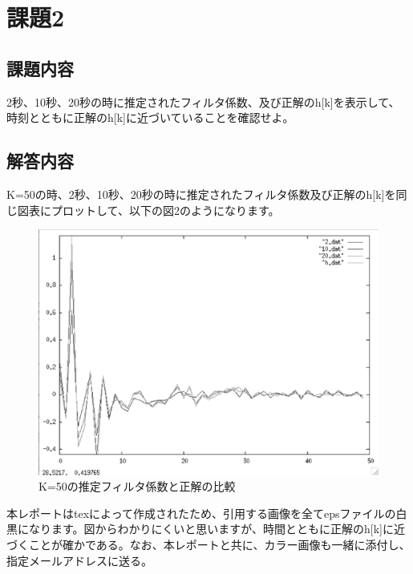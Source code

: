 \documentclass[a4j,12]{jarticle}
\begin{document}
       \section{課題2}
       \subsection{課題内容}
       2秒、10秒、20秒の時に推定されたフィルタ係数、及び正解のh[k]を表示して、時刻とともに正解のh[k]に近づいていることを確認せよ。
       \subsection{解答内容}
       K=50の時、2秒、10秒、20秒の時に推定されたフィルタ係数及び正解のh[k]を同じ図表にプロットして、以下の図2のようになります。
       \begin{figure}[htpb]
         \begin{center}
           \includegraphics[width=15cm]{h.eps}%
           \caption{K=50の推定フィルタ係数と正解の比較}
           \label{micon}
         \end{center}
       \end{figure}
       本レポートはtexによって作成されたため、引用する画像を全てepsファイルの白黒になります。図からわかりにくいと思いますが、時間とともに正解のh[k]に近づくことが確かである。なお、本レポートと共に、カラー画像も一緒に添付し、指定メールアドレスに送る。
       
\end{document}
